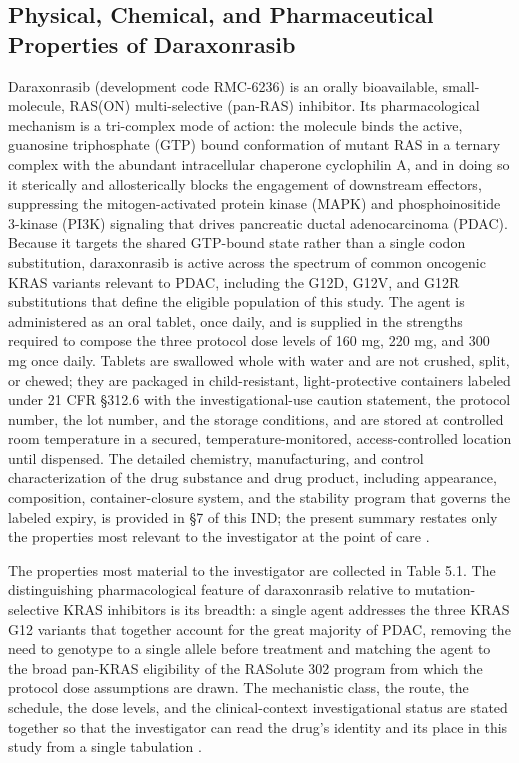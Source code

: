 \subsection*{Physical, Chemical, and Pharmaceutical Properties of Daraxonrasib}

Daraxonrasib (development code RMC-6236) is an orally bioavailable, small-molecule,
RAS(ON) multi-selective (pan-RAS) inhibitor. Its pharmacological mechanism is a
tri-complex mode of action: the molecule binds the active, guanosine triphosphate
(GTP) bound conformation of mutant RAS in a ternary complex with the abundant
intracellular chaperone cyclophilin A, and in doing so it sterically and
allosterically blocks the engagement of downstream effectors, suppressing the
mitogen-activated protein kinase (MAPK) and phosphoinositide 3-kinase (PI3K)
signaling that drives pancreatic ductal adenocarcinoma (PDAC). Because it targets
the shared GTP-bound state rather than a single codon substitution, daraxonrasib is
active across the spectrum of common oncogenic KRAS variants relevant to PDAC,
including the G12D, G12V, and G12R substitutions that define the eligible population
of this study. The agent is administered as an oral tablet, once daily, and is
supplied in the strengths required to compose the three protocol dose levels of
160 mg, 220 mg, and 300 mg once daily. Tablets are swallowed whole with water and
are not crushed, split, or chewed; they are packaged in child-resistant,
light-protective containers labeled under 21 CFR \S 312.6 with the
investigational-use caution statement, the protocol number, the lot number, and the
storage conditions, and are stored at controlled room temperature in a secured,
temperature-monitored, access-controlled location until dispensed. The detailed
chemistry, manufacturing, and control characterization of the drug substance and
drug product, including appearance, composition, container-closure system, and the
stability program that governs the labeled expiry, is provided in \S 7 of this IND;
the present summary restates only the properties most relevant to the investigator
at the point of care \cite{daraxwhipple,pdac060s2030}.

The properties most material to the investigator are collected in Table 5.1. The
distinguishing pharmacological feature of daraxonrasib relative to mutation-selective
KRAS inhibitors is its breadth: a single agent addresses the three KRAS G12 variants
that together account for the great majority of PDAC, removing the need to genotype
to a single allele before treatment and matching the agent to the broad pan-KRAS
eligibility of the RASolute 302 program from which the protocol dose assumptions are
drawn. The mechanistic class, the route, the schedule, the dose levels, and the
clinical-context investigational status are stated together so that the investigator
can read the drug's identity and its place in this study from a single tabulation
\cite{daraxwhipple,natlpaiplatf}.

